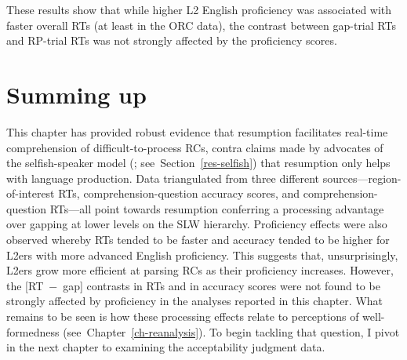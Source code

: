 These results show that while higher L2 English proficiency was associated with faster overall RTs (at least in the ORC data), the contrast between gap-trial RTs and RP-trial RTs was not strongly affected by the proficiency scores.

\section{Summing up}\label{spr-conclusion}

This chapter has provided robust evidence that resumption facilitates real-time comprehension of difficult-to-process RCs, contra claims made by advocates of the selfish-speaker model (\cite{ferreira.swets2005,morgan.etal2020,polinsky.etal2013}; see~Section~\ref{res-selfish}) that resumption only helps with language production. Data triangulated from three different sources---region-of-interest RTs, comprehension-question accuracy scores, and comprehension-question RTs---all point towards resumption conferring a processing advantage over gapping at lower levels on the SLW hierarchy. Proficiency effects were also observed whereby RTs tended to be faster and accuracy tended to be higher for L2ers with more advanced English proficiency. This suggests that, unsurprisingly, L2ers grow more efficient at parsing RCs as their proficiency increases. However, the [RT~−~gap] contrasts in RTs and in accuracy scores were not found to be strongly affected by proficiency in the analyses reported in this chapter.  What remains to be seen is how these processing effects relate to perceptions of well-formedness (see~Chapter~\ref{ch-reanalysis}). To begin tackling that question, I pivot in the next chapter to examining the acceptability judgment data.